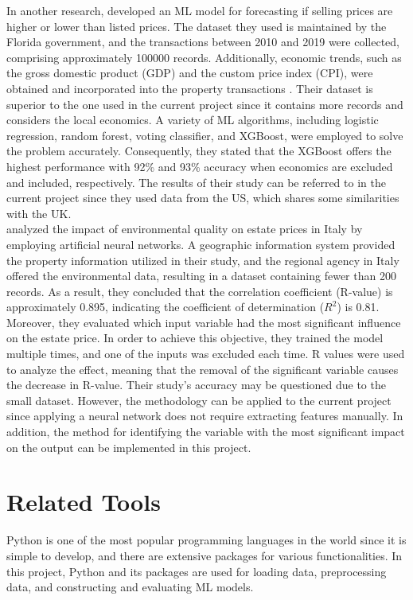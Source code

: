 \documentclass[12pt,twoside]{report}
\begin{document}
In another research, \citet{RN20} developed an ML model for forecasting if selling prices are higher or lower than listed prices. The dataset they used is maintained by the Florida government, and the transactions between 2010 and 2019 were collected, comprising approximately 100000 records. Additionally, economic trends, such as the gross domestic product (GDP) and the custom price index (CPI), were obtained and incorporated into the property transactions \cite{RN20}. Their dataset is superior to the one used in the current project since it contains more records and considers the local economics. A variety of ML algorithms, including logistic regression, random forest, voting classifier, and XGBoost, were employed to solve the problem accurately. Consequently, they stated that the XGBoost offers the highest performance with 92\% and 93\% accuracy when economics are excluded and included, respectively. The results of their study can be referred to in the current project since they used data from the US, which shares some similarities with the UK.
\\

\citet{RN37} analyzed the impact of environmental quality on estate prices in Italy by employing artificial neural networks. A geographic information system provided the property information utilized in their study, and the regional agency in Italy offered the environmental data, resulting in a dataset containing fewer than 200 records. As a result, they concluded that the correlation coefficient (R-value) is approximately 0.895, indicating the coefficient of determination ($R^2$) is 0.81. Moreover, they evaluated which input variable had the most significant influence on the estate price. In order to achieve this objective, they trained the model multiple times, and one of the inputs was excluded each time. R values were used to analyze the effect, meaning that the removal of the significant variable causes the decrease in R-value. Their study's accuracy may be questioned due to the small dataset. However, the methodology can be applied to the current project since applying a neural network does not require extracting features manually. In addition, the method for identifying the variable with the most significant impact on the output can be implemented in this project.

\section{Related Tools}
Python is one of the most popular programming languages in the world since it is simple to develop, and there are extensive packages for various functionalities. In this project, Python and its packages are used for loading data, preprocessing data, and constructing and evaluating ML models. 
\end{document}
